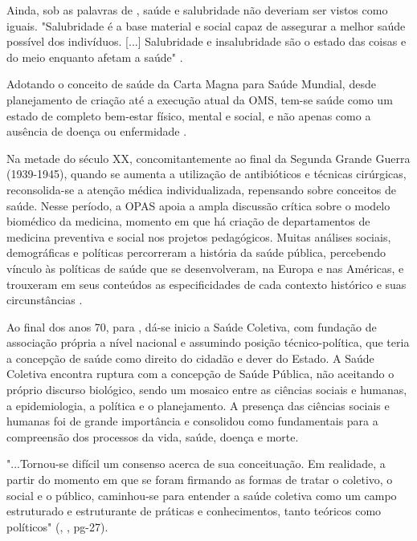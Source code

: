 \indent Ainda, sob as palavras de , saúde e salubridade não deveriam ser vistos como iguais. "Salubridade é a base material e social capaz de assegurar a melhor saúde possível dos indivíduos. [...] Salubridade e insalubridade são o estado das coisas e do meio enquanto afetam a saúde"  \cite{Foucault1990Microfisica}.

\indent Adotando o conceito de saúde da Carta Magna para Saúde Mundial, desde planejamento de criação até a execução atual da \acrfull{OMS}, tem-se saúde como um estado de completo bem-estar físico, mental e social, e não apenas como a ausência de doença ou enfermidade \cite{OMS2024S1, ParranHEALTH}.

\indent  Na metade do século XX, concomitantemente ao final da Segunda Grande Guerra (1939-1945), quando se aumenta a utilização de antibióticos e técnicas cirúrgicas, reconsolida-se a atenção médica individualizada, repensando sobre conceitos de saúde. Nesse período, a \acrfull{OPAS} apoia a ampla discussão crítica sobre o modelo biomédico da medicina, momento em que há criação de departamentos de medicina preventiva e social nos projetos pedagógicos. Muitas análises sociais, demográficas e políticas percorreram a história da saúde pública, percebendo vínculo às políticas de saúde que se desenvolveram, na Europa e nas Américas, e trouxeram em seus conteúdos as especificidades de cada contexto histórico e suas circunstâncias \cite{TratadoSaudeColetiva}.

\indent Ao final dos anos 70, para , dá-se inicio a Saúde Coletiva, com fundação de associação própria a nível nacional e assumindo posição técnico-política, que teria a concepção de saúde como direito do cidadão e dever do Estado. A Saúde Coletiva encontra ruptura com a concepção de Saúde Pública, não aceitando o próprio discurso biológico, sendo um mosaico entre as ciências sociais e humanas, a epidemiologia, a política e o planejamento. A presença das ciências sociais e humanas foi de grande importância e consolidou como fundamentais para a compreensão dos processos da vida, saúde, doença e morte.

\begin{citacao}
\indent "...Tornou-se difícil um consenso acerca de sua conceituação. Em realidade, a partir do momento em que se foram firmando as formas de tratar o coletivo, o social e o público, caminhou-se para entender a saúde coletiva como um campo estruturado e estruturante de práticas e conhecimentos, tanto teóricos como políticos" (\citeauthor{TratadoSaudeColetiva}, \citeyear{TratadoSaudeColetiva}, pg-27).
\end{citacao}


